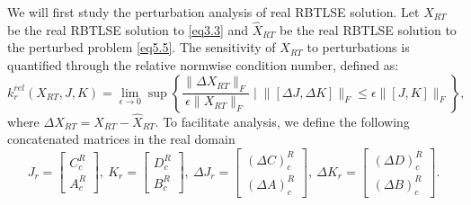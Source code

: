 \documentclass[preprint,11pt,3p]{elsarticle}
\begin{document}
We will first study the perturbation analysis of real RBTLSE solution. Let $X_{RT}$ be the real RBTLSE solution to \eqref{eq3.3} and $\widehat{X}_{RT}$ be the real RBTLSE solution to the perturbed problem \eqref{eq5.5}. The sensitivity of $X_{RT}$ to perturbations is quantified through the relative normwise condition number, defined as:
\begin{equation}\label{eq5.6}
	\mathit{k}^{rel}_r(X_{RT}, J, K) = \lim \limits_{\epsilon \rightarrow 0} \sup \left\{\frac{\|\Delta X_{RT}\|_F}{\epsilon \|X_{RT}\|_F} \; | \; \|[\Delta J, \Delta K]\|_F \leq \epsilon \|[J, K]\|_F\right\},
\end{equation} 
where $\Delta X_{RT}= X_{RT}-\widehat{X}_{RT}$. To facilitate analysis, we define the following concatenated matrices in the real domain
\begin{equation}\label{eq5.7}
	J_r = \begin{bmatrix}
	C^R_c \\
		A^R_c
	\end{bmatrix}, ~ K_r = \begin{bmatrix}
		D^R_c \\
		B^R_c
	\end{bmatrix}, ~ \Delta J_r = \begin{bmatrix}
	(\Delta C)^R_c \\
	(\Delta A)^R_c
\end{bmatrix}, ~ \Delta K_r = \begin{bmatrix}
(\Delta D)^R_c \\
(\Delta B)^R_c
\end{bmatrix}.
\end{equation}
\end{document}
